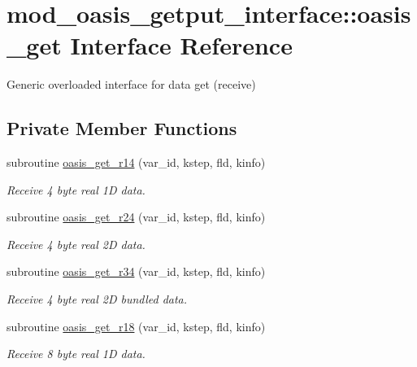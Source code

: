 \hypertarget{interfacemod__oasis__getput__interface_1_1oasis__get}{}\section{mod\+\_\+oasis\+\_\+getput\+\_\+interface\+:\+:oasis\+\_\+get Interface Reference}
\label{interfacemod__oasis__getput__interface_1_1oasis__get}


Generic overloaded interface for data get (receive)  


\subsection*{Private Member Functions}
\begin{DoxyCompactItemize}
\item 
subroutine \hyperlink{interfacemod__oasis__getput__interface_1_1oasis__get_af8755eb7d3a5f52268752317dd955547}{oasis\+\_\+get\+\_\+r14} (var\+\_\+id, kstep, fld, kinfo)
\begin{DoxyCompactList}\small\item\em Receive 4 byte real 1D data. \end{DoxyCompactList}\item 
subroutine \hyperlink{interfacemod__oasis__getput__interface_1_1oasis__get_a808646dc6bb30d294eeab54170b36cec}{oasis\+\_\+get\+\_\+r24} (var\+\_\+id, kstep, fld, kinfo)
\begin{DoxyCompactList}\small\item\em Receive 4 byte real 2D data. \end{DoxyCompactList}\item 
subroutine \hyperlink{interfacemod__oasis__getput__interface_1_1oasis__get_a6f50944dcac492a8a53983bba93f2385}{oasis\+\_\+get\+\_\+r34} (var\+\_\+id, kstep, fld, kinfo)
\begin{DoxyCompactList}\small\item\em Receive 4 byte real 2D bundled data. \end{DoxyCompactList}\item 
subroutine \hyperlink{interfacemod__oasis__getput__interface_1_1oasis__get_ae79dab0345adf5fd221047e5fddf0f2f}{oasis\+\_\+get\+\_\+r18} (var\+\_\+id, kstep, fld, kinfo)
\begin{DoxyCompactList}\small\item\em Receive 8 byte real 1D data. \end{DoxyCompactList}\item 

\end{DoxyCompactItemize}
